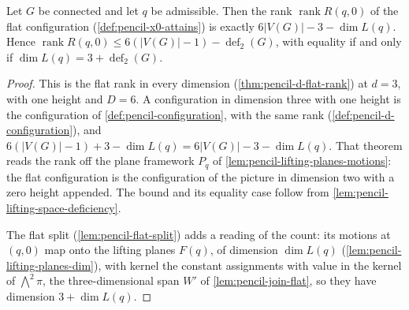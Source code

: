 \begin{theorem}
  \label{thm:pencil-flat-rank}
  \leanok
  Let $G$ be connected and let $q$ be admissible. Then the rank
  $\operatorname{rank} R(q, 0)$ of the flat configuration
  (\cref{def:pencil-x0-attains}) is exactly
  $6|V(G)| - 3 - \dim L(q)$. Hence
  $\operatorname{rank} R(q, 0) \le 6(|V(G)| - 1) - \operatorname{def}_2(G)$,
  with equality if and only if $\dim L(q) = 3 + \operatorname{def}_2(G)$.
\end{theorem}
\begin{proof}
  \leanok
  This is the flat rank in every dimension (\cref{thm:pencil-d-flat-rank})
  at $d = 3$, with one height and $D = 6$. A configuration in dimension
  three with one height is the configuration of
  \cref{def:pencil-configuration}, with the same rank
  (\cref{def:pencil-d-configuration}), and
  $6(|V(G)| - 1) + 3 - \dim L(q) = 6|V(G)| - 3 - \dim L(q)$. That theorem
  reads the rank off the plane framework $P_q$ of
  \cref{lem:pencil-lifting-planes-motions}: the flat configuration is the
  configuration of the picture in dimension two with a zero height
  appended. The bound and its equality case follow from
  \cref{lem:pencil-lifting-space-deficiency}.

  The flat split (\cref{lem:pencil-flat-split}) adds a reading of the
  count: its motions at $(q, 0)$ map onto the lifting planes $F(q)$, of
  dimension $\dim L(q)$ (\cref{lem:pencil-lifting-planes-dim}), with
  kernel the constant assignments with value in the kernel of
  $\bigwedge^2 \pi$, the three-dimensional span $W'$ of
  \cref{lem:pencil-join-flat}, so they have dimension $3 + \dim L(q)$.
\end{proof}

